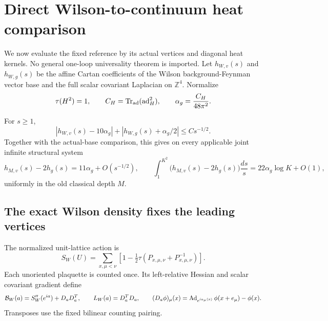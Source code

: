 \section{Direct Wilson-to-continuum heat comparison}
\label{wcr-section}

We now evaluate the fixed reference by its actual vertices and diagonal
heat kernels. No general one-loop universality theorem is imported.
Let \(h_{W,v}(s)\) and \(h_{W,g}(s)\) be the affine Cartan coefficients
of the Wilson background-Feynman vector base and the full scalar
covariant Laplacian on \(\mathbb Z^4\). Normalize
\[
 \tau(H^2)=1,\qquad C_H=\operatorname{Tr}_{\rm ad}
       (\operatorname{ad}_H^2),\qquad \alpha_g=\frac{C_H}{48\pi^2}.
\]

\begin{theorem}
\label{wcr-main}
For \(s\ge1\),
\begin{equation}
 |h_{W,v}(s)-10\alpha_g|
 +|h_{W,g}(s)+\alpha_g/2|\le Cs^{-1/2}.
 \label{wcr-fixed-bound}
\end{equation}
Together with the actual-base comparison, this gives on every
applicable joint infinite structural system
\begin{equation}
 h_{M,v}(s)-2h_g(s)=11\alpha_g+O(s^{-1/2}),\qquad
 \int_1^{K^2}\bigl(h_{M,v}(s)-2h_g(s)\bigr)\frac{ds}{s}
       =22\alpha_g\log K+O(1),
 \label{wcr-middle}
\end{equation}
uniformly in the old classical depth \(M\).
\end{theorem}

\subsection{The exact Wilson density fixes the leading vertices}
\label{wcr-density-section}

The normalized unit-lattice action is
\[
 S_W(U)=\sum_{x,\mu<\nu}
 \left[1-\tfrac12\tau(P_{x,\mu,\nu}+P_{x,\mu,\nu}^{-1})\right].
\]
Each unoriented plaquette is counted once. Its left-relative Hessian and
scalar covariant gradient define
\[
 {\cal B}_W(a)=S_W''(e^{ia})+D_aD_a^T,\qquad
 L_W(a)=D_a^TD_a,\qquad
 (D_a\phi)_\mu(x)=\operatorname{Ad}_{e^{ia_\mu(x)}}\phi(x+e_\mu)-\phi(x).
\]
Transposes use the fixed bilinear counting pairing.

